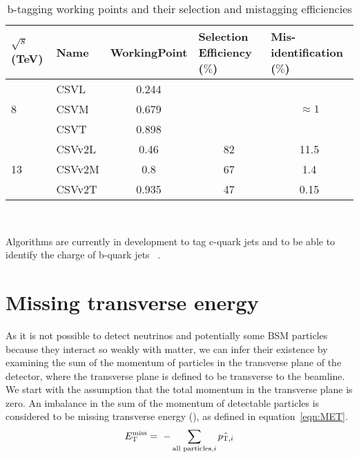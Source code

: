 \begin{table}[htpb!]
\footnotesize
\begin{center}
\begin{tabular}{l|l|c|c|c}
$\sqrt{s}$ (TeV)    & Name   & \multicolumn{1}{l|}{WorkingPoint} & \multicolumn{1}{l|}{Selection Efficiency ($\%$)} & \multicolumn{1}{l}{Mis-identification ($\%$)} \\ \hline
\multirow{3}{*}{8}  & CSVL   & 0.244                             &                                                  &                                               \\ \cline{2-5} 
                    & CSVM   & 0.679                             &                                                  & $\approx 1$                                   \\ \cline{2-5} 
                    & CSVT   & 0.898                             &                                                  &                                               \\ \hline
\multirow{3}{*}{13} & CSVv2L & 0.46                              & 82                                               & 11.5                                          \\ \cline{2-5} 
                    & CSVv2M & 0.8                               & 67                                               & 1.4                                           \\ \cline{2-5} 
                    & CSVv2T & 0.935                             & 47                                               & 0.15                                         
\end{tabular}
\caption{b-tagging working points and their selection and mistagging efficiencies}
\label{tab:btag}
\end{center}
\end{table}
~

Algorithms are currently in development to tag c-quark jets and to be able to identify the charge of b-quark jets ~.

\section{Missing transverse energy ~\label{sec:METreco}}
As it is not possible to detect neutrinos and potentially some BSM particles because they interact so weakly with matter, we can infer their existence by examining the sum of the momentum of particles in the transverse plane of the detector, where the transverse plane is defined to be transverse to the beamline. We start with the assumption that the total momentum in the transverse plane is zero. An imbalance in the sum of the momentum of detectable particles is considered to be missing transverse energy (\ETmiss), as defined in equation~\ref{eqn:MET}.
\begin{equation}
E_{\mathrm{T}}^{\text{miss}} = ~- \sum_{\textrm{all particles,}i} \hat{ {p}_{\textrm{T},i} }
\label{eqn:MET}
\end{equation}

